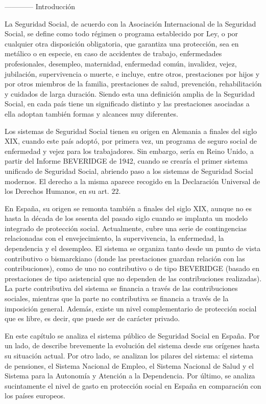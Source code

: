 \documentclass[10pt,a4paper]{article}
\begin{document}
------------ Introducción

La Seguridad Social, de acuerdo con la Asociación Internacional de la Seguridad Social, se define como todo régimen o programa establecido por Ley, o por cualquier otra disposición obligatoria, que garantiza una protección, sea en metálico o en especie, en caso de accidentes de trabajo, enfermedades profesionales, desempleo, maternidad, enfermedad común, invalidez, vejez, jubilación, supervivencia o muerte, e incluye, entre otros, prestaciones por hijos y por otros miembros de la familia, prestaciones de salud, prevención, rehabilitación y cuidados de larga duración. Siendo esta una definición amplia de la Seguridad Social, en cada país tiene un significado distinto y las prestaciones asociadas a ella adoptan también formas y alcances muy diferentes.

Los sistemas de Seguridad Social tienen su origen en Alemania a finales del siglo XIX, cuando este país adoptó, por primera vez, un programa de seguro social de enfermedad y vejez para los trabajadores. Sin embargo, sería en Reino Unido, a partir del Informe BEVERIDGE de 1942, cuando se crearía el primer sistema unificado de Seguridad Social, abriendo paso a los sistemas de Seguridad Social modernos. El derecho a la misma aparece recogido en la Declaración Universal de los Derechos Humanos, en su art. $22$. 

En España, su origen se remonta también a finales del siglo XIX, aunque no es hasta la década de los sesenta del pasado siglo cuando se implanta un modelo integrado de protección social. Actualmente, cubre una serie de contingencias relacionadas con el envejecimiento, la supervivencia, la enfermedad, la dependencia y el desempleo. El sistema se organiza tanto desde un punto de vista contributivo o bismarckiano (donde las prestaciones guardan relación con las contribuciones), como de uno no contributivo o de tipo BEVERIDGE (basado en prestaciones de tipo asistencial que no dependen de las contribuciones realizadas). La parte contributiva del sistema se financia a través de las contribuciones sociales, mientras que la parte no contributiva se financia a través de la imposición general. Además, existe un nivel complementario de protección social que es libre, es decir, que puede ser de carácter privado.

En este capítulo se analiza el sistema público de Seguridad Social en España. Por un lado, de describe brevemente la evolución del sistema desde sus orígenes hasta su situación actual. Por otro lado, se analizan los pilares del sistema: el sistema de pensiones, el Sistema Nacional de Empleo, el Sistema Nacional de Salud y el Sistema para la Autonomía y Atención a la Dependencia. Por último, se analiza sucintamente el nivel de gasto en protección social en España en comparación con los países europeos.
\end{document}
